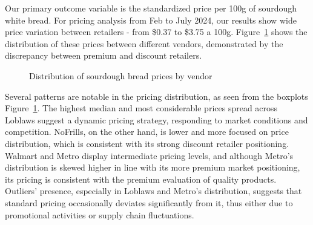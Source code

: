 \documentclass[
  letterpaper,
  DIV=11,
  numbers=noendperiod]{scrartcl}
\begin{document}
Our primary outcome variable is the standardized price per 100g of
sourdough white bread. For pricing analysis from Feb to July 2024, our
results show wide price variation between retailers - from \$0.37 to
\$3.75 a 100g. Figure~\ref{fig-price-dist} shows the distribution of
these prices between different vendors, demonstrated by the discrepancy
between premium and discount retailers.

\begin{figure}[H]


\caption{\label{fig-price-dist}Distribution of sourdough bread prices by
vendor}

\end{figure}%

Several patterns are notable in the pricing distribution, as seen from
the boxplots Figure~\ref{fig-price-dist}. The highest median and most
considerable prices spread across Loblaws suggest a dynamic pricing
strategy, responding to market conditions and competition. NoFrills, on
the other hand, is lower and more focused on price distribution, which
is consistent with its strong discount retailer positioning. Walmart and
Metro display intermediate pricing levels, and although Metro's
distribution is skewed higher in line with its more premium market
positioning, its pricing is consistent with the premium evaluation of
quality products. Outliers' presence, especially in Loblaws and Metro's
distribution, suggests that standard pricing occasionally deviates
significantly from it, thus either due to promotional activities or
supply chain fluctuations.
\end{document}
